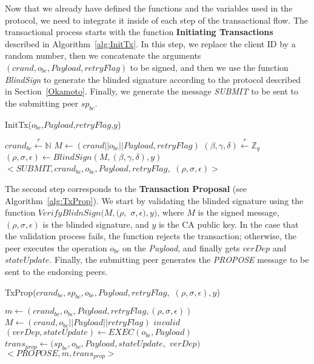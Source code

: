 \documentclass[conference]{llncs}
\begin{document}
Now that we already have defined the functions and the variables used in the protocol, we need to integrate it inside of each step of the transactional flow. The transactional process starts with the function \textbf{Initiating Transactions} described in Algorithm~\ref{alg:InitTx}. In this step, we replace the client ID by a random number, then we concatenate the arguments $(crand,o_{bc},Payload,retryFlag)$ to be signed, and then we use the function \textit{BlindSign} to generate the blinded signature according to the protocol described in Section~\ref{Okamoto}. Finally, we generate the message \textit{SUBMIT} to be sent to the submitting peer $sp_{bc}$.

\begin{algorithm}[ht]
\caption{InitTx($o_{bc}$,$Payload$,$retryFlag$,$y$)}
\label{alg:InitTx}
\begin{algorithmic}[1]
\STATE $crand_{bc}\xleftarrow[]{r}\mathbb{N}$            
\STATE $M \gets (crand||o_{bc}||Payload,retryFlag)$
\STATE $(\beta,\gamma,\delta)\xleftarrow[]{r}\mathbb{Z}_q$  
\STATE $(\rho,\sigma,\epsilon) \gets BlindSign(M,(\beta,\gamma,\delta),y)$
\RETURN $<\textit{SUBMIT},crand_{bc},o_{bc},Payload,retryFlag,$ $(\rho,\sigma,\epsilon)>$
\end{algorithmic}
\end{algorithm}

The second step corresponds to the \textbf{Transaction Proposal} (see
Algorithm~\ref{alg:TxProp}). We start by validating
the blinded signature using the function $VerifyBlidnSign(M,(\rho,$ $\sigma,\epsilon),y)$, where $M$ is the signed message, $(\rho,\sigma,\epsilon)$ is the blinded signature, and $y$ is the CA public key. In the case that the validation process fails, the function rejects the transaction; otherwise, the peer executes the operation $o_{bc}$ on the \textit{Payload}, and finally gets $verDep$ and $stateUpdate$. Finally, the submitting peer generates the \textit{PROPOSE} message to be sent to the endorsing peers.

\begin{algorithm}[ht]
\caption{TxProp($crand_{bc},sp_{bc},o_{bc},Payload,retryFlag,$ $(\rho,\sigma,\epsilon),y$)}
\label{alg:TxProp}
\begin{algorithmic}[1]
\STATE $m \gets (crand_{bc},o_{bc},Payload,retryFlag,(\rho,\sigma,\epsilon))$
\STATE $M \gets (crand,o_{bc}||Payload||retryFlag)$
  \RETURN $invalid$ \ELSE
\STATE $(verDep,stateUpdate) \gets EXEC(o_{{bc}},Payload)$ 
\STATE $trans_{prop} \gets (sp_{bc},o_{bc},Payload,stateUpdate,$ $verDep)$
\RETURN $<\textit{PROPOSE},m,trans_{prop}>$
\ENDIF
\end{algorithmic}
\end{algorithm}
\end{document}
